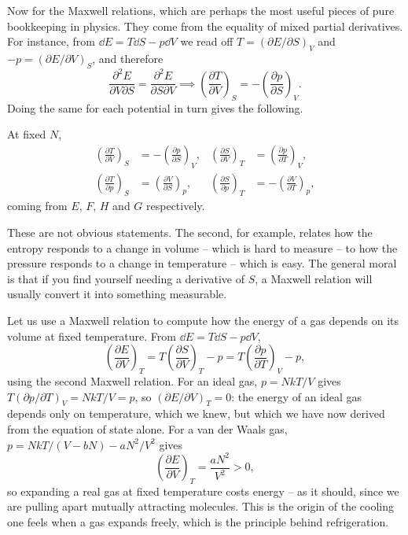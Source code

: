 \documentclass[a4paper]{scrartcl}
\begin{document}
Now for the Maxwell relations, which are perhaps the most useful pieces of pure bookkeeping in physics. They come from the equality of mixed partial derivatives. For instance, from $\dd E = T\dd S - p\dd V$ we read off $T = (\partial E/\partial S)_V$ and $-p = (\partial E/\partial V)_S$, and therefore
$$
\frac{\partial^2 E}{\partial V\partial S} = \frac{\partial^2 E}{\partial S\partial V} \implies \left(\frac{\partial T}{\partial V}\right)_S = -\left(\frac{\partial p}{\partial S}\right)_V.
$$
Doing the same for each potential in turn gives the following.

\begin{proposition}
	At fixed $N$,
	\begin{align*}
		\left(\frac{\partial T}{\partial V}\right)_S &= -\left(\frac{\partial p}{\partial S}\right)_V, &
		\left(\frac{\partial S}{\partial V}\right)_T &= \left(\frac{\partial p}{\partial T}\right)_V,\\
		\left(\frac{\partial T}{\partial p}\right)_S &= \left(\frac{\partial V}{\partial S}\right)_p, &
		\left(\frac{\partial S}{\partial p}\right)_T &= -\left(\frac{\partial V}{\partial T}\right)_p,
	\end{align*}
	coming from $E$, $F$, $H$ and $G$ respectively.
\end{proposition}

These are not obvious statements. The second, for example, relates how the entropy responds to a change in volume -- which is hard to measure -- to how the pressure responds to a change in temperature -- which is easy. The general moral is that if you find yourself needing a derivative of $S$, a Maxwell relation will usually convert it into something measurable.

\begin{example}
	Let us use a Maxwell relation to compute how the energy of a gas depends on its volume at fixed temperature. From $\dd E = T\dd S - p\dd V$,
	$$
	\left(\frac{\partial E}{\partial V}\right)_T = T\left(\frac{\partial S}{\partial V}\right)_T - p = T\left(\frac{\partial p}{\partial T}\right)_V - p,
	$$
	using the second Maxwell relation. For an ideal gas, $p = NkT/V$ gives $T(\partial p/\partial T)_V = NkT/V = p$, so $(\partial E/\partial V)_T = 0$: the energy of an ideal gas depends only on temperature, which we knew, but which we have now derived from the equation of state alone. For a van der Waals gas, $p = NkT/(V-bN) - aN^2/V^2$ gives
	$$
	\left(\frac{\partial E}{\partial V}\right)_T = \frac{aN^2}{V^2} > 0,
	$$
	so expanding a real gas at fixed temperature costs energy -- as it should, since we are pulling apart mutually attracting molecules. This is the origin of the cooling one feels when a gas expands freely, which is the principle behind refrigeration.
\end{example}
\end{document}
